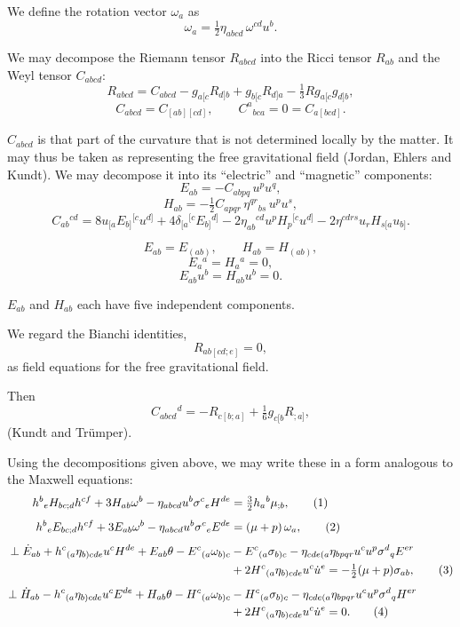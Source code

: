 We define the rotation vector \(\omega_{a}\) as
\[
\omega_{a} = \tfrac{1}{2} \eta_{abcd} \, \omega^{cd} u^{b}.
\]

\medskip

We may decompose the Riemann tensor \(R_{abcd}\) into the Ricci tensor 
\(R_{ab}\) and the Weyl tensor \(C_{abcd}\):
\[
R_{abcd} = C_{abcd} - g_{a[c} R_{d]b} + g_{b[c} R_{d]a} - \tfrac{1}{3} R g_{a[c} g_{d]b},
\]
\[
C_{abcd} = C_{[ab][cd]}, \qquad C^{a}{}_{bca} = 0 = C_{a[ bcd ]}.
\]

\(C_{abcd}\) is that part of the curvature that is not determined locally by 
the matter. It may thus be taken as representing the free gravitational 
field (Jordan, Ehlers and Kundt\cite{JordanKundt1960}).  
We may decompose it into its ``electric'' and ``magnetic'' components:
\[
E_{ab} = - C_{a b p q}\, u^{p} u^{q}, 
\]
\[
H_{ab} = - \tfrac{1}{2} C_{a p q r}\, \eta^{qr}{}_{bs}\, u^{p} u^{s},
\]
\[
C_{ab}{}^{cd} 
= 8 u_{[a} E_{b]}{}^{[c} u^{d]} 
+ 4 \delta_{[a}{}^{[c} E_{b]}{}^{d]}
- 2 \eta_{ab}{}^{cd} u^{p} H_{p}{}^{[c} u^{d]}
- 2 \eta^{cdrs} u_{r} H_{s[a} u_{b]} .
\]

\[
E_{ab} = E_{(ab)}, 
\qquad H_{ab} = H_{(ab)},
\]
\[
E_{a}{}^{a} = H_{a}{}^{a} = 0,
\]
\[
E_{ab} u^{b} = H_{ab} u^{b} = 0.
\]

\(E_{ab}\) and \(H_{ab}\) each have five independent components.  

We regard the Bianchi identities,
\[
R_{ab[cd;e]} = 0,
\]
as field equations for the free gravitational field.  

Then
\[
C_{abc d}{}^{d} = - R_{c[b;a]} + \tfrac{1}{6} g_{c[b} R_{;a]},
\]
(Kundt and Trümper\cite{KundtTrumper1962}).

Using the decompositions given above, we may write these in a form 
analogous to the Maxwell equations:
\begin{align}
h^{b}{}_{e} H_{bc;d} h^{cf} + 3 H_{ab} \omega^{b} - \eta_{abcd} u^{b} \sigma^{c}{}_{e} H^{de} 
&= \tfrac{3}{2} h_{a}{}^{b} \mu_{;b}, \tag{1} \\[1ex]
h^{b}{}_{e} E_{bc;d} h^{cf} + 3 E_{ab} \omega^{b} - \eta_{abcd} u^{b} \sigma^{c}{}_{e} E^{de} 
&= (\mu + p) \, \omega_{a}, \tag{2} \\[1ex]
\perp \dot{E}_{ab} + h^{c}{}_{(a} \eta_{b)cde} u^{c} H^{de} + E_{ab} \theta - E^{c}{}_{(a} \omega_{b)c} 
&- E^{c}{}_{(a} \sigma_{b)c} - \eta_{cde(a} \eta_{bpqr} u^{c} u^{p} \sigma^{d}{}_{q} E^{er} \notag \\ 
&+ 2 H^{c}{}_{(a} \eta_{b)cde} u^{c} \dot{u}^{e} = -\tfrac{1}{2} (\mu + p) \sigma_{ab}, \tag{3} \\[1ex]
\perp \dot{H}_{ab} - h^{c}{}_{(a} \eta_{b)cde} u^{c} E^{de} + H_{ab} \theta - H^{c}{}_{(a} \omega_{b)c} 
&- H^{c}{}_{(a} \sigma_{b)c} - \eta_{cde(a} \eta_{bpqr} u^{c} u^{p} \sigma^{d}{}_{q} H^{er} \notag \\ 
&+ 2 H^{c}{}_{(a} \eta_{b)cde} u^{c} \dot{u}^{e} = 0. \tag{4}
\end{align}

